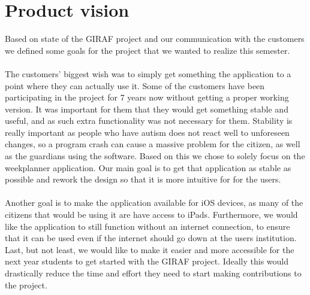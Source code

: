 \section{Product vision}
Based on state of the GIRAF project and our communication with the customers we defined some goals for the project that we wanted to realize this semester.
\\\\
The customers' biggest wish was to simply get something the application to a point where they can actually use it.
Some of the customers have been participating in the project for 7 years now without getting a proper working version.
It was important for them that they would get something stable and useful, and as such extra functionality was not necessary for them.
Stability is really important as people who have autism does not react well to unforeseen changes, so a program crash can cause a massive problem for the citizen, as well as the guardians using the software.
Based on this we chose to solely focus on the weekplanner application.
Our main goal is to get that application as stable as possible and rework the design so that it is more intuitive for for the users.
\\\\
Another goal is to make the application available for iOS devices, as many of the citizens that would be using it are have access to iPads.
Furthermore, we would like the application to still function without an internet connection, to ensure that it can be used even if the internet should go down at the users institution.
Last, but not least, we would like to make it easier and more accessible for the next year students to get started with the GIRAF project.
Ideally this would drastically reduce the time and effort they need to start making contributions to the project.